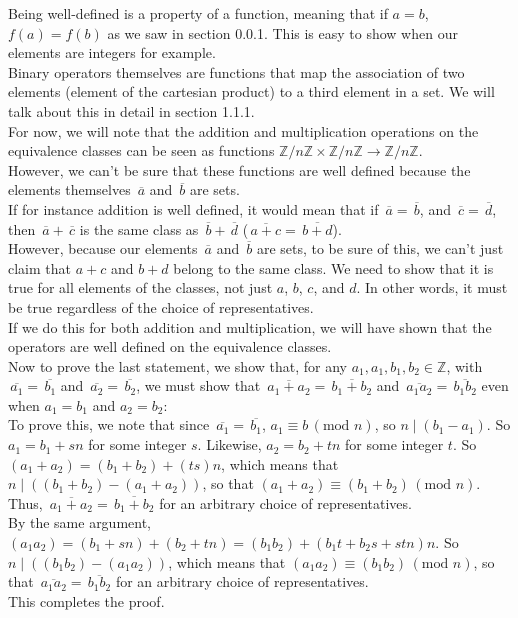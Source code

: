 \documentclass[12pt]{article}
\newcommand{\Z}{\mathbb{Z}}
\newcommand{\olsi}[1]{\,\overline{\!{#1}}}
\begin{document}
    Being well-defined is a property of a function,
    meaning that if $a = b$, $f(a) = f(b)$
    as we saw in section 0.0.1.
    This is easy to show when our elements are integers for example. \\
    Binary operators themselves are functions that
    map the association of two elements
    (element of the cartesian product) to a third element in a set.
    We will talk about this in detail in section 1.1.1. \\
    For now, we will note that the addition and multiplication
    operations on the equivalence classes can be seen as
    functions $\Z/n\Z \times \Z/n\Z \to \Z/n\Z$. \\
    However, we can't be sure that these functions are well defined
    because the elements themselves $\olsi{a}$ and $\olsi{b}$ are sets. \\
    If for instance addition is well defined,
    it would mean that if $\olsi{a} = \olsi{b}$,
    and $\olsi{c} = \olsi{d}$,
    then $\olsi{a} + \olsi{c}$ is the same class as $\olsi{b} + \olsi{d}$
    ($\olsi{a + c} = \olsi{b + d}$). \\
    However, because our elements $\olsi{a}$ and $\olsi{b}$ are sets,
    to be sure of this,
    we can't just claim that $a + c$ and $b + d$ belong to the same
    class.
    We need to show that it is true for all elements of the classes,
    not just $a$, $b$, $c$, and $d$.
    In other words, it must be true regardless
    of the choice of representatives. \\
    If we do this for both addition and multiplication,
    we will have shown that the operators are well defined
    on the equivalence classes. \\

    Now to prove the last statement,
    we show that, for any $a_1, a_1, b_1, b_2 \in \Z$,
    with $\olsi{a_1} = \olsi{b_1}$ and  $\olsi{a_2} = \olsi{b_2}$,
    we must show that $\olsi{a_1 + a_2} = \olsi{b_1 + b_2}$
    and  $\olsi{a_1a_2} = \olsi{b_1b_2}$
    even when $a_1 = b_1$ and $a_2 = b_2$: \\
    To prove this, we note that since $\olsi{a_1} = \olsi{b_1}$,
    $a_1 \equiv b \, (\text{mod } n)$,
    so $n \mid (b_1 - a_1)$. So $a_1 = b_1 + sn$ for some integer $s$.
    Likewise, $a_2 = b_2 + tn$ for some integer $t$.
    So $(a_1 + a_2) = (b_1 + b_2) + (ts)n$,
    which means that $n \mid ((b_1 + b_2) - (a_1 + a_2))$,
    so that $(a_1 + a_2) \equiv (b_1 + b_2) \, (\text{mod } n)$.
    Thus, $\olsi{a_1 + a_2} = \olsi{b_1 + b_2}$ for an arbitrary
    choice of representatives. \\
    By the same argument,
    $(a_1a_2) = (b_1 + sn) + (b_2 + tn) = (b_1b_2) + (b_1t+b_2s + stn)n$.
    So $n \mid ((b_1b_2) - (a_1a_2))$,
    which means that $(a_1a_2) \equiv (b_1b_2) \, (\text{mod } n)$,
    so that $\olsi{a_1a_2} = \olsi{b_1b_2}$ for an arbitrary
    choice of representatives. \\
    This completes the proof. \\
\end{document}
